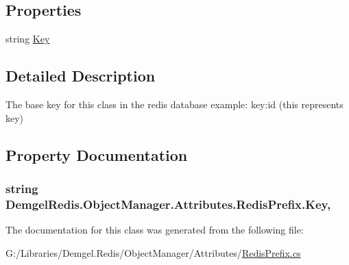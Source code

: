 \subsection*{Properties}
\begin{DoxyCompactItemize}
\item 
string \hyperlink{class_demgel_redis_1_1_object_manager_1_1_attributes_1_1_redis_prefix_a97e66b5f54e34375bf484590770fa8aa}{Key}
\end{DoxyCompactItemize}


\subsection{Detailed Description}
The base key for this class in the redis database example\+: key\+:id (this represents key) 



\subsection{Property Documentation}
\hypertarget{class_demgel_redis_1_1_object_manager_1_1_attributes_1_1_redis_prefix_a97e66b5f54e34375bf484590770fa8aa}{}
\subsubsection[{Key}]{\setlength{\rightskip}{0pt plus 5cm}string Demgel\+Redis.\+Object\+Manager.\+Attributes.\+Redis\+Prefix.\+Key\hspace{0.3cm}{\ttfamily [get]}, {\ttfamily [set]}}\label{class_demgel_redis_1_1_object_manager_1_1_attributes_1_1_redis_prefix_a97e66b5f54e34375bf484590770fa8aa}


The documentation for this class was generated from the following file\+:\begin{DoxyCompactItemize}
\item 
G\+:/\+Libraries/\+Demgel.\+Redis/\+Object\+Manager/\+Attributes/\hyperlink{_redis_prefix_8cs}{Redis\+Prefix.\+cs}\end{DoxyCompactItemize}
